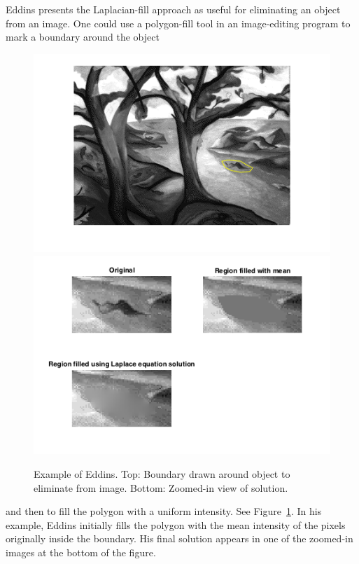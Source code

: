 \documentclass{article}
\begin{document}
Eddins presents the Laplacian-fill approach as useful for eliminating an object
from an image. One could use a polygon-fill tool in an image-editing program to
mark a boundary around the object
\begin{figure}
   \begin{center}
   \includegraphics[width=0.99\columnwidth]{exploring_regionfill_01}
   \includegraphics[width=0.99\columnwidth]{exploring_regionfill_12}
   \end{center}
   \caption{Example of Eddins. Top: Boundary drawn around object to eliminate
   from image. Bottom: Zoomed-in view of solution.}
   \label{fig:boundary}
\end{figure}
and then to fill the polygon with a uniform intensity.  See
Figure~\ref{fig:boundary}.  In his example, Eddins initially fills the polygon
with the mean intensity of the pixels originally inside the boundary.  His
final solution appears in one of the zoomed-in images at the bottom of the
figure.
\end{document}
